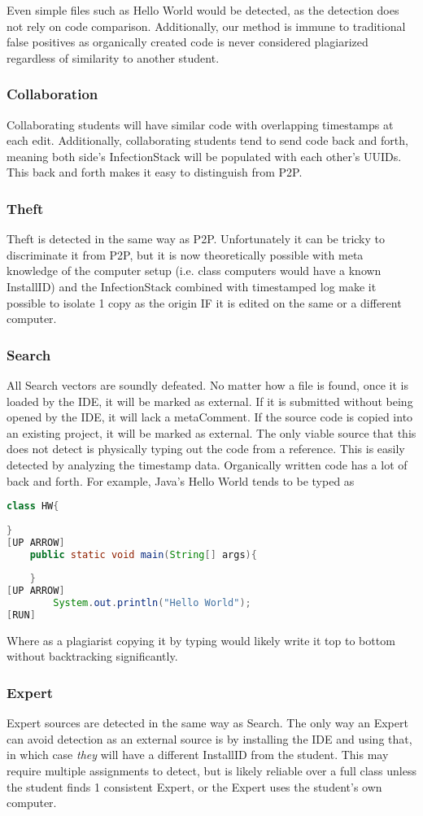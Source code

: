 \documentclass[letterpaper,10pt,conference]{IEEEtran}
\newcommand{\installID}{InstallID\xspace}
\newcommand{\metaComment}{metaComment\xspace}
\newcommand{\infectionStack}{InfectionStack\xspace}
\begin{document}
		Even simple files such as Hello World would be detected, as the detection does not rely on code comparison. Additionally, our method is immune to traditional false positives as organically created code is never considered plagiarized regardless of similarity to another student.
	\subsubsection{Collaboration}
		Collaborating students will have similar code with overlapping timestamps at each edit.  Additionally, collaborating students tend to send code back and forth, meaning both side's \infectionStack will be populated with each other's UUIDs.  This back and forth makes it easy to distinguish from P2P.
	\subsubsection{Theft}
	Theft is detected in the same way as P2P.  Unfortunately it can be tricky to discriminate it from P2P, but it is now theoretically possible with meta knowledge of the computer setup (i.e. class computers would have a known \installID) and the \infectionStack combined with timestamped log make it possible to isolate 1 copy as the origin IF it is edited on the same or a different computer.  
	\subsubsection{Search}
		All Search vectors are soundly defeated.  No matter how a file is found, once it is loaded by the IDE, it will be marked as external. If it is submitted without being opened by the IDE, it will lack a \metaComment.  If the source code is copied into an existing project, it will be marked as external.  The only viable source that this does not detect is physically typing out the code from a reference.  This is easily detected by analyzing the timestamp data.  Organically written code has a lot of back and forth.  For example, Java's Hello World tends to be typed as 
\begin{lstlisting}[language=Java]
class HW{
		
}
[UP ARROW]
	public static void main(String[] args){
	
	}
[UP ARROW]
		System.out.println("Hello World");
[RUN]
\end{lstlisting}
Where as a plagiarist copying it by typing would likely write it top to bottom without backtracking significantly.
	\subsubsection{Expert} 
	Expert sources are detected in the same way as Search.  The only way an Expert can avoid detection as an external source is by installing the IDE and using that, in which case \textit{they} will have a different \installID from the student.  This may require multiple assignments to detect, but is likely reliable over a full class unless the student finds 1 consistent Expert, or the Expert uses the student's own computer.
\end{document}
